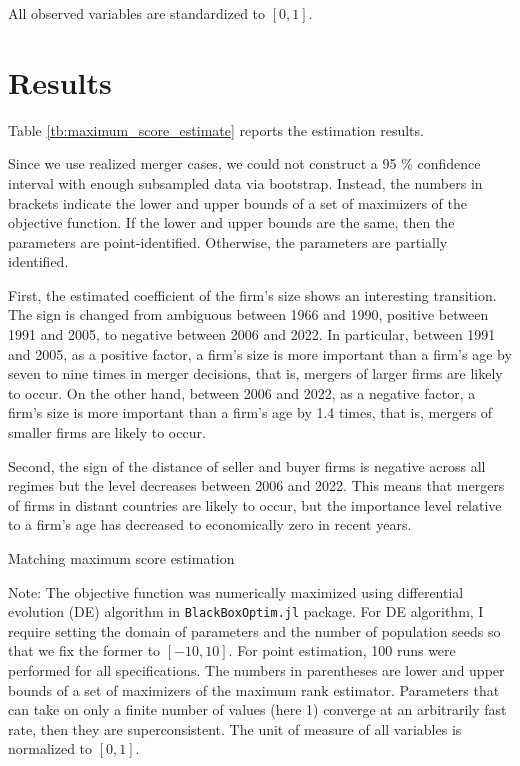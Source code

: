 \documentclass[10pt]{article}
\begin{document}
All observed variables are standardized to $[0,1]$.

\section{Results}

Table \ref{tb:maximum_score_estimate} reports the estimation results. 

Since we use realized merger cases, we could not construct a 95 \% confidence interval with enough subsampled data via bootstrap.
Instead, the numbers in brackets indicate the lower and upper bounds of a set of maximizers of the objective function. 
If the lower and upper bounds are the same, then the parameters are point-identified. Otherwise, the parameters are partially identified.

First, the estimated coefficient of the firm's size shows an interesting transition. 
The sign is changed from ambiguous between 1966 and 1990, positive between 1991 and 2005, to negative between 2006 and 2022. 
In particular, between 1991 and 2005, as a positive factor, a firm's size is more important than a firm's age by seven to nine times in merger decisions, that is, mergers of larger firms are likely to occur.
On the other hand, between 2006 and 2022, as a negative factor, a firm's size is more important than a firm's age by 1.4 times, that is, mergers of smaller firms are likely to occur.

Second, the sign of the distance of seller and buyer firms is negative across all regimes but the level decreases between 2006 and 2022. 
This means that mergers of firms in distant countries are likely to occur, but the importance level relative to a firm's age has decreased to economically zero in recent years.

\begin{table}[!htbp]
  \begin{center}
      \caption{Matching maximum score estimation}
      \label{tb:maximum_score_estimate} 
      
  \end{center}\footnotesize
  Note:  The objective function was numerically maximized using differential evolution (DE) algorithm in \texttt{BlackBoxOptim.jl} package. For DE algorithm, I require setting the domain of parameters and the number of population seeds so that we fix the former to $[-10, 10]$. For point estimation, 100 runs were performed for all specifications. The numbers in parentheses are lower and upper bounds of a set of maximizers of the maximum rank estimator.  Parameters that can take on only a finite number of values (here 1) converge at an arbitrarily fast rate, then they are superconsistent. The unit of measure of all variables is normalized to $[0,1]$. 
\end{table} 
\end{document}
